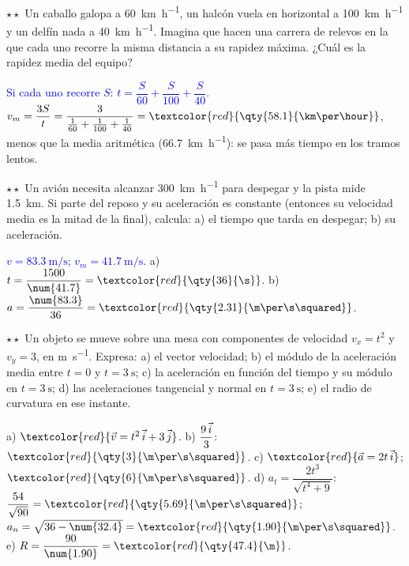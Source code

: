 \begin{exercise}
    \(\star\star\) Un caballo galopa a \qty{60}{\km\per\hour}, un halcón vuela en horizontal a \qty{100}{\km\per\hour} y un delfín
    nada a \qty{40}{\km\per\hour}. Imagina que hacen una carrera de relevos en la que cada uno recorre la misma distancia a su
    rapidez máxima. ¿Cuál es la rapidez media del equipo?
    \begin{solu}
        \textcolor{blue}{Si cada uno recorre \(S\): \(t = \dfrac{S}{60} + \dfrac{S}{100} + \dfrac{S}{40}\).}
        \(v_m = \dfrac{3S}{t} = \dfrac{3}{\frac{1}{60} + \frac{1}{100} + \frac{1}{40}} = \textcolor{red}{\qty{58.1}{\km\per\hour}}\),
        menos que la media aritmética (\qty{66.7}{\km\per\hour}): se pasa más tiempo en los tramos lentos.
    \end{solu}
\end{exercise}

\begin{exercise}
    \(\star\star\) Un avión necesita alcanzar \qty{300}{\km\per\hour} para despegar y la pista mide \qty{1.5}{\km}. Si parte del
    reposo y su aceleración es constante (entonces su velocidad media es la mitad de la final), calcula: a) el tiempo que tarda
    en despegar; b) su aceleración.
    \begin{solu}
        \textcolor{blue}{\(v = \qty{83.3}{\m\per\s}\); \(v_m = \qty{41.7}{\m\per\s}\).} a) \(t = \dfrac{1500}{\num{41.7}} =
        \textcolor{red}{\qty{36}{\s}}\). b) \(a = \dfrac{\num{83.3}}{36} = \textcolor{red}{\qty{2.31}{\m\per\s\squared}}\).
    \end{solu}
\end{exercise}

\begin{exercise}
    \(\star\star\) Un objeto se mueve sobre una mesa con componentes de velocidad \(v_x = t^2\) y \(v_y = 3\), en \unit{\m\per\s}.
    Expresa: a) el vector velocidad; b) el módulo de la aceleración media entre \(t = 0\) y \(t = \qty{3}{\s}\); c) la aceleración
    en función del tiempo y su módulo en \(t = \qty{3}{\s}\); d) las aceleraciones tangencial y normal en \(t = \qty{3}{\s}\);
    e) el radio de curvatura en ese instante.
    \begin{solu}
        a) \(\textcolor{red}{\vec v = t^2\,\ivec + 3\,\jvec}\). b) \(\dfrac{9\,\vec{i}}{3}\): \(\textcolor{red}{\qty{3}{\m\per\s\squared}}\).
        c) \(\textcolor{red}{\vec a = 2t\,\ivec}\); \(\textcolor{red}{\qty{6}{\m\per\s\squared}}\). d) \(a_t = \dfrac{2t^3}{\sqrt{t^4 + 9}}\):
        \(\dfrac{54}{\sqrt{90}} = \textcolor{red}{\qty{5.69}{\m\per\s\squared}}\); \(a_n = \sqrt{36 - \num{32.4}} = \textcolor{red}{\qty{1.90}{\m\per\s\squared}}\).
        e) \(R = \dfrac{90}{\num{1.90}} = \textcolor{red}{\qty{47.4}{\m}}\).
    \end{solu}
\end{exercise}

